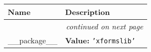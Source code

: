     \vspace{-1cm}
\hspace{\varindent}\begin{longtable}{|p{\varnamewidth}|p{\vardescrwidth}|l}
\cline{1-2}
\cline{1-2} \centering \textbf{Name} & \centering \textbf{Description}& \\
\cline{1-2}
\endhead\cline{1-2}\multicolumn{3}{r}{\small\textit{continued on next page}}\\\endfoot\cline{1-2}
\endlastfoot\raggedright \_\-\_\-p\-a\-c\-k\-a\-g\-e\-\_\-\_\- & \raggedright \textbf{Value:} 
{\tt \texttt{'}\texttt{xformslib}\texttt{'}}&\\
\cline{1-2}
\end{longtable}

